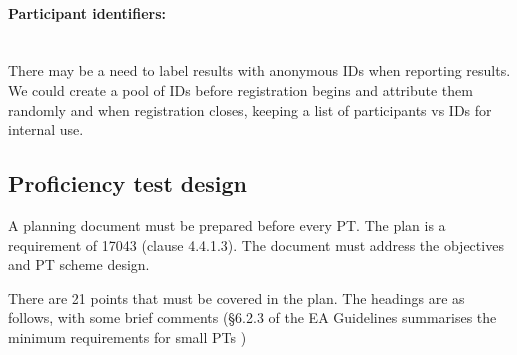 
\paragraph{Participant identifiers:}\mbox{}\\
There may be a need to label results with anonymous IDs when reporting results. We could create a pool of IDs before registration begins and attribute them randomly and when registration closes, keeping a list of participants vs IDs for internal use.
 

\subsection{Proficiency test design}
\label{ss:PT_design}
A planning document must be prepared before every PT. The plan is a requirement of 17043 (clause 4.4.1.3).  The document must address the objectives and PT scheme design. 


There are 21 points that must be covered in the plan. The headings are as follows, with some brief comments (\S6.2.3 of the EA Guidelines summarises the minimum requirements for small PTs \cite{EA-4/21}) 

